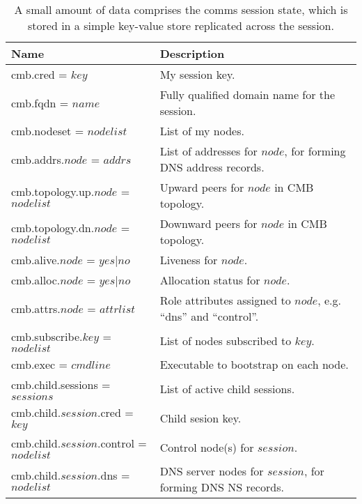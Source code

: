 \begin{table}
  \centering
  \begin{tabular}{| l | p{} |}\hline
  \textbf{Name} & \textbf{Description} \\
  \hline
  cmb.cred = $key$ &
        My session key.\\
  cmb.fqdn = $name$ &
        Fully qualified domain name for the session.\\
  cmb.nodeset = $nodelist$ &
        List of my nodes.\\
  cmb.addrs.$node$ = $addrs$ &
        List of addresses for $node$, for forming DNS address records.\\
  cmb.topology.up.$node$ = $nodelist$ & 
        Upward peers for $node$ in CMB topology.\\
  cmb.topology.dn.$node$ = $nodelist$ &
        Downward peers for $node$ in CMB topology.\\
  cmb.alive.$node$ = $yes|no$ &
        Liveness for $node$.\\
  cmb.alloc.$node$ = $yes|no$ &
        Allocation status for $node$.\\
  cmb.attrs.$node$ = $attrlist$ &
	Role attributes assigned to $node$, e.g. ``dns'' and ``control''.\\
  cmb.subscribe.$key$ = $nodelist$ &
        List of nodes subscribed to $key$.\\
  cmb.exec = $cmdline$ &
        Executable to bootstrap on each node.\\
  \hline
  cmb.child.sessions = $sessions$ &
        List of active child sessions.\\
  cmb.child.$session$.cred = $key$ &
        Child sesion key.\\
  cmb.child.$session$.control = $nodelist$ &
        Control node(s) for $session$.\\
  cmb.child.$session$.dns = $nodelist$ &
        DNS server nodes for $session$, for forming DNS NS records.\\
  \hline
  \end{tabular}
  \caption{A small amount of data comprises the comms session state,
	   which is stored in a simple key-value store replicated across
	   the session.}
  \label{TabCMBState}
\end{table}

